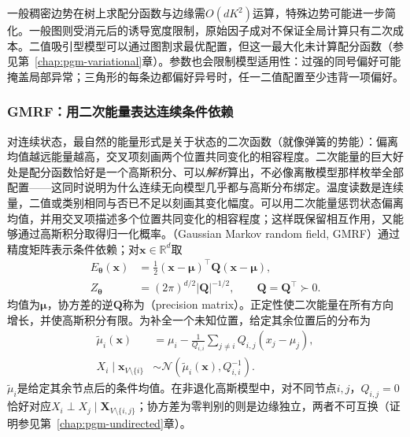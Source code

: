 一般稠密边势在树上求配分函数与边缘需$O(dK^2)$运算，特殊边势可能进一步简化。一般图则受消元后的诱导宽度限制，原始因子成对不保证全局计算只有二次成本。二值吸引型模型可以通过图割求最优配置，但这一最大化未计算配分函数（参见第~\ref{chap:pgm-variational}章）。参数也会限制模型适用性：过强的同号偏好可能掩盖局部异常；三角形的每条边都偏好异号时，任一二值配置至少违背一项偏好。

\subsubsection{GMRF：用二次能量表达连续条件依赖}
\label{sec:pgm-energy-models-gmrf}

对连续状态，最自然的能量形式是关于状态的二次函数（就像弹簧的势能）：偏离均值越远能量越高，交叉项刻画两个位置共同变化的相容程度。二次能量的巨大好处是配分函数恰好是一个高斯积分、可以\emph{解析}算出，不必像离散模型那样枚举全部配置——这同时说明为什么连续无向模型几乎都与高斯分布绑定。温度读数是连续量，二值或类别相同与否已不足以刻画其变化幅度。可以用二次能量惩罚状态偏离均值，并用交叉项描述多个位置共同变化的相容程度；这样既保留相互作用，又能够通过高斯积分取得归一化概率。（Gaussian Markov random field, GMRF）通过精度矩阵表示条件依赖；对$\bm{x}\in\mathbb{R}^d$取
\begin{equation}
  \begin{aligned}
    E_{\bm{\theta}}(\bm{x})
      &=\frac12(\bm{x}-\bm{\mu})^\top
                    \bm{Q}(\bm{x}-\bm{\mu}),\\
    Z_{\bm{\theta}}
      &=(2\pi)^{d/2}|\bm{Q}|^{-1/2},
      \qquad \bm{Q}=\bm{Q}^\top\succ0.
  \end{aligned}
  \label{eq:pgm-energy-models-gaussian}
\end{equation}
均值为$\bm{\mu}$，协方差的逆$\bm{Q}$称为（precision matrix）。正定性使二次能量在所有方向增长，并使高斯积分有限。为补全一个未知位置，给定其余位置后的分布为
\[
  \begin{aligned}
    \widetilde{\mu}_i(\bm{x})
      &=\mu_i-\frac{1}{Q_{i,i}}
           \sum_{j\ne i}Q_{i,j}(x_j-\mu_j),\\
    X_i\mid\bm{x}_{V\setminus\{i\}}
      &\sim\mathcal{N}\!\left(
          \widetilde{\mu}_i(\bm{x}),Q_{i,i}^{-1}\right).
  \end{aligned}
\]
$\widetilde{\mu}_i$是给定其余节点后的条件均值。在非退化高斯模型中，对不同节点$i,j$，$Q_{i,j}=0$恰好对应$X_i\perp X_j\mid\bm{X}_{V\setminus\{i,j\}}$；协方差为零判别的则是边缘独立，两者不可互换（证明参见第~\ref{chap:pgm-undirected}章）。

